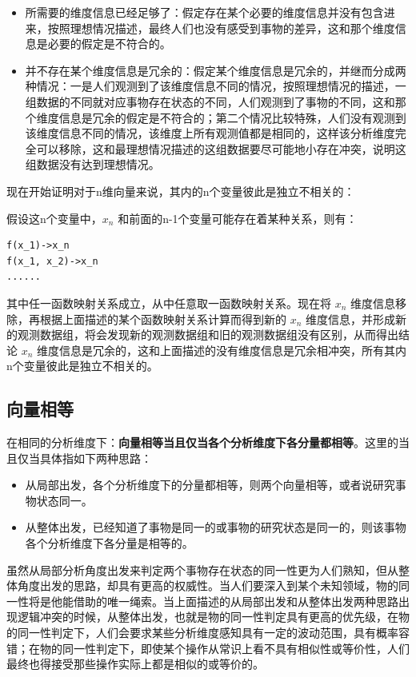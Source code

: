 \documentclass[12pt,oneside]{book}
\begin{document}
\begin{itemize}
\item 所需要的维度信息已经足够了：假定存在某个必要的维度信息并没有包含进来，按照理想情况描述，最终人们也没有感受到事物的差异，这和那个维度信息是必要的假定是不符合的。
\item 并不存在某个维度信息是冗余的：假定某个维度信息是冗余的，并继而分成两种情况：一是人们观测到了该维度信息不同的情况，按照理想情况的描述，一组数据的不同就对应事物存在状态的不同，人们观测到了事物的不同，这和那个维度信息是冗余的假定是不符合的；第二个情况比较特殊，人们没有观测到该维度信息不同的情况，该维度上所有观测值都是相同的，这样该分析维度完全可以移除，这和最理想情况描述的这组数据要尽可能地小存在冲突，说明这组数据没有达到理想情况。
\end{itemize}

现在开始证明对于n维向量来说，其内的n个变量彼此是独立不相关的：

假设这n个变量中，$x_n$ 和前面的n-1个变量可能存在着某种关系，则有：

\begin{Verbatim}
f(x_1)->x_n
f(x_1, x_2)->x_n
......
\end{Verbatim}

其中任一函数映射关系成立，从中任意取一函数映射关系。现在将 $x_n$ 维度信息移除，再根据上面描述的某个函数映射关系计算而得到新的 $x_n$ 维度信息，并形成新的观测数据组，将会发现新的观测数据组和旧的观测数据组没有区别，从而得出结论 $x_n$ 维度信息是冗余的，这和上面描述的没有维度信息是冗余相冲突，所有其内n个变量彼此是独立不相关的。

\subsection{向量相等}
在相同的分析维度下：\textbf{向量相等当且仅当各个分析维度下各分量都相等}。这里的当且仅当具体指如下两种思路：

\begin{itemize}
\item 从局部出发，各个分析维度下的分量都相等，则两个向量相等，或者说研究事物状态同一。
\item 从整体出发，已经知道了事物是同一的或事物的研究状态是同一的，则该事物各个分析维度下各分量是相等的。
\end{itemize}

虽然从局部分析角度出发来判定两个事物存在状态的同一性更为人们熟知，但从整体角度出发的思路，却具有更高的权威性。当人们要深入到某个未知领域，物的同一性将是他能借助的唯一绳索。当上面描述的从局部出发和从整体出发两种思路出现逻辑冲突的时候，从整体出发，也就是物的同一性判定具有更高的优先级，在物的同一性判定下，人们会要求某些分析维度感知具有一定的波动范围，具有概率容错；在物的同一性判定下，即使某个操作从常识上看不具有相似性或等价性，人们最终也得接受那些操作实际上都是相似的或等价的。
\end{document}

